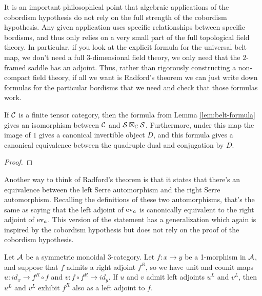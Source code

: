 \documentclass{amsart}
\begin{document}
It is an important philosophical point that algebraic applications of the cobordism hypothesis do not rely on the full strength of the cobordism hypothesis.  Any given application uses specific relationships between specific bordisms, and thus only relies on a very small part of the full topological field theory.  In particular, if you look at the explicit formula for the universal belt map, we don't need a full $3$-dimensional field theory, we only need that the $2$-framed saddle has an adjoint.  Thus, rather than rigorously constructing a non-compact field theory, if all we want is Radford's theorem we can just write down formulas for the particular bordisms that we need and check that those formulas work.

\begin{theorem}
If $\mathcal C$ is a finite tensor category, then the formula from Lemma \ref{lem:belt-formula} gives an isomorphism between $\mathcal C$ and $\mathcal S \boxtimes_\mathcal C \mathcal S$.  Furthermore, under this map the image of $1$ gives a canonical invertible object $D$, and this formula gives a canonical equivalence between the quadruple dual and conjugation by $D$.
\end{theorem}
\begin{proof}
\end{proof}

Another way to think of Radford's theorem is that it states that there's an equivalence between the left Serre automorphism and the right Serre automorphism.  Recalling the definitions of these two automorphisms, that's the same as saying that the left adjoint of $\mathrm{ev}_a$ is canonically equivalent to the right adjoint of $\mathrm{ev}_a$.  This version of the statement has a generalization which again is inspired by the cobordism hypothesis but does not rely on the proof of the cobordism hypothesis.


\begin{proposition} \label{prop-ambiadjoints}
	Let $\mathcal A$ be a symmetric monoidal 3-category. Let $f: x \to y$ be a 1-morphism in $\mathcal A$, and suppose that $f$ admits a right adjoint $f^R$,  so we have unit and counit maps $u:id_x \to f^R \circ f$ and $v:f \circ f^R \to id_y$. If $u$ and $v$ admit left adjoints $u^L$ and $v^L$, then $u^L$ and $v^L$ exhibit $f^R$ also as a left adjoint to $f$. 
\end{proposition}
\end{document}

